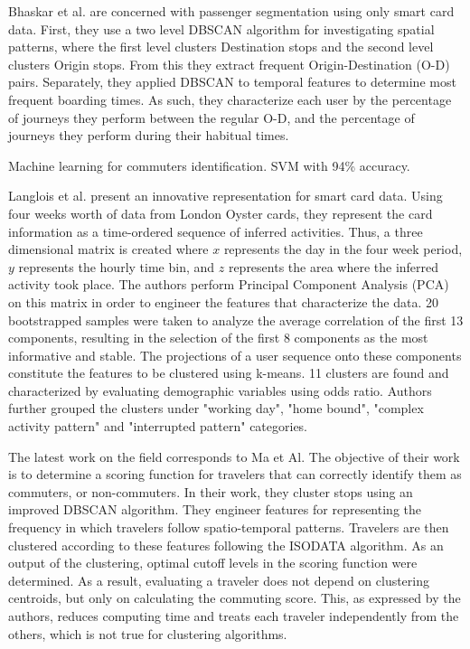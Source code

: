 \documentclass{article}
\begin{document}

Bhaskar et al. are concerned with passenger segmentation using only smart card data. 
First, they use a two level DBSCAN algorithm for investigating spatial patterns, where the first level clusters Destination stops and the second level clusters Origin stops.  From this they extract frequent Origin-Destination (O-D) pairs. Separately, they applied DBSCAN to temporal features to determine most frequent boarding times.  As such, they characterize each user by the percentage of journeys they perform between the regular O-D, and the percentage of journeys they perform during their habitual times. \cite{bhaskar2015passenger}

Machine learning for commuters identification. SVM with 94\% accuracy. \cite{tu2016impact}

Langlois et al. \cite{langlois2016inferring} present an innovative representation for smart card data. Using four weeks worth of data from London Oyster cards, they represent the card information as a time-ordered sequence of inferred activities. Thus, a three dimensional matrix is created where $x$ represents the day in the four week period, $y$ represents the hourly time bin, and $z$ represents the area where the inferred activity took place. The authors perform Principal Component Analysis (PCA) on this matrix in order to engineer the features that characterize the data. 20 bootstrapped samples were taken to analyze the average correlation of the first 13 components, resulting in the selection of the first 8 components as the most informative and stable. The projections of a user sequence onto these components constitute the features to be clustered using k-means. 11 clusters are found and characterized by evaluating demographic variables using odds ratio. Authors further grouped the clusters under "working day", "home bound", "complex activity pattern" and "interrupted pattern" categories. 

The latest work on the field corresponds to Ma et Al. \cite{ma2017understanding} The objective of their work is to determine a scoring function for travelers that can correctly identify them as commuters, or non-commuters. In their work, they cluster stops using an improved DBSCAN algorithm. They engineer features for representing the frequency in which travelers follow spatio-temporal patterns. Travelers are then clustered according to these features following the ISODATA algorithm. As an output of the clustering, optimal cutoff levels in the scoring function were determined. As a result, evaluating a traveler does not depend on clustering centroids, but only on calculating the commuting score. This, as expressed by the authors, reduces computing time and treats each traveler independently from the others, which is not true for clustering algorithms.
\end{document}
